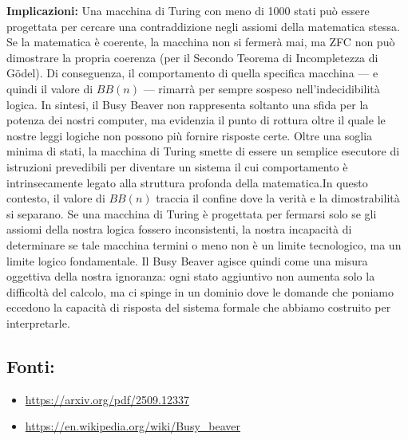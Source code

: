 \documentclass[12pt, a4paper, oneside]{article}
\begin{document}
\textbf{Implicazioni:}
Una macchina di Turing con meno di 1000 stati può essere progettata per cercare una contraddizione negli assiomi della matematica stessa. Se la matematica è coerente, la macchina non si fermerà mai, ma ZFC non può dimostrare la propria coerenza (per il Secondo Teorema di Incompletezza di Gödel). Di conseguenza, il comportamento di quella specifica macchina — e quindi il valore di $BB(n)$ — rimarrà per sempre sospeso nell'indecidibilità logica. In sintesi, il Busy Beaver non rappresenta soltanto una sfida per la potenza dei nostri computer, ma evidenzia il punto di rottura oltre il quale le nostre leggi logiche non possono più fornire risposte certe. Oltre una soglia minima di stati, la macchina di Turing smette di essere un semplice esecutore di istruzioni prevedibili per diventare un sistema il cui comportamento è intrinsecamente legato alla struttura profonda della matematica.In questo contesto, il valore di $BB(n)$ traccia il confine dove la verità e la dimostrabilità si separano. Se una macchina di Turing è progettata per fermarsi solo se gli assiomi della nostra logica fossero inconsistenti, la nostra incapacità di determinare se tale macchina termini o meno non è un limite tecnologico, ma un limite logico fondamentale. Il Busy Beaver agisce quindi come una misura oggettiva della nostra ignoranza: ogni stato aggiuntivo non aumenta solo la difficoltà del calcolo, ma ci spinge in un dominio dove le domande che poniamo eccedono la capacità di risposta del sistema formale che abbiamo costruito per interpretarle.

\subsection*{Fonti:}
\begin{itemize}
    \item \url{https://arxiv.org/pdf/2509.12337}
    \item \url{https://en.wikipedia.org/wiki/Busy_beaver}
\end{itemize}
\end{document}
